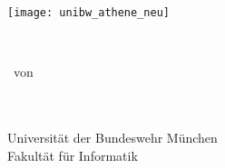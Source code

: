 
\thispagestyle{empty}

\begin{center}

\vspace*{1cm}

\texttt{[image: unibw\_athene\_neu]}

\vspace{1.5cm}
{\Huge %
\textbf{\Dtitel}\\ %
} %
\vspace{1.5cm}


{\Large %
\Darbeit \ von\\ %
\Dname\\ %
\Dnummer\\ %
}%

\vspace{1cm}
\Dversion %

\vfill

{\Large %
Universität der Bundeswehr München\\
Fakultät für Informatik\\
}


\end{center}

\newpage


\thispagestyle{empty}
\cleardoublepage


\thispagestyle{empty}

